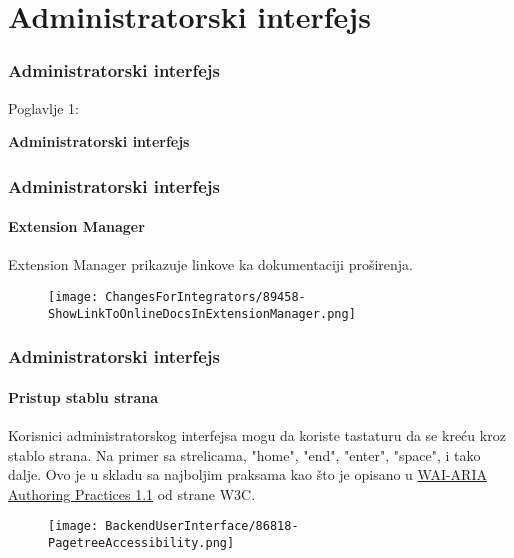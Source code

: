 %

\section{Administratorski interfejs}
\begin{frame}[fragile]
	\frametitle{Administratorski interfejs}

	\begin{center}\huge{Poglavlje 1:}\end{center}
	\begin{center}\huge{\color{typo3darkgrey}\textbf{Administratorski interfejs}}\end{center}

\end{frame}


\begin{frame}[fragile]
	\frametitle{Administratorski interfejs}
	\framesubtitle{Extension Manager}

	Extension Manager prikazuje linkove ka dokumentaciji proširenja.

	\begin{figure}
		\texttt{[image: ChangesForIntegrators/89458-ShowLinkToOnlineDocsInExtensionManager.png]}
	\end{figure}

\end{frame}


\begin{frame}[fragile]
	\frametitle{Administratorski interfejs}
	\framesubtitle{Pristup stablu strana}

	Korisnici administratorskog interfejsa mogu da koriste tastaturu da se kreću
	kroz stablo strana. Na primer sa strelicama, "home", "end", "enter", "space", i tako dalje.
	\newline
	Ovo je u skladu sa najboljim praksama kao što je opisano u
	\href{https://www.w3.org/TR/wai-aria-practices-1.1/#keyboard-interaction-22}{WAI-ARIA Authoring Practices 1.1}
	od strane W3C.

	\begin{figure}
		\texttt{[image: BackendUserInterface/86818-PagetreeAccessibility.png]}
	\end{figure}

\end{frame}

